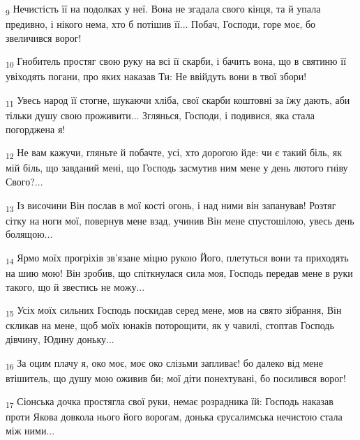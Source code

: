 \begin{tcolorbox}
\textsubscript{9} Нечистість її на подолках у неї. Вона не згадала свого кінця, та й упала предивно, і нікого нема, хто б потішив її... Побач, Господи, горе моє, бо звеличився ворог!
\end{tcolorbox}
\begin{tcolorbox}
\textsubscript{10} Гнобитель простяг свою руку на всі її скарби, і бачить вона, що в святиню її увіходять погани, про яких наказав Ти: Не ввійдуть вони в твої збори!
\end{tcolorbox}
\begin{tcolorbox}
\textsubscript{11} Увесь народ її стогне, шукаючи хліба, свої скарби коштовні за їжу дають, аби тільки душу свою проживити... Зглянься, Господи, і подивися, яка стала погорджена я!
\end{tcolorbox}
\begin{tcolorbox}
\textsubscript{12} Не вам кажучи, гляньте й побачте, усі, хто дорогою йде: чи є такий біль, як мій біль, що завданий мені, що Господь засмутив ним мене у день лютого гніву Свого?...
\end{tcolorbox}
\begin{tcolorbox}
\textsubscript{13} Із височини Він послав в мої кості огонь, і над ними він запанував! Розтяг сітку на ноги мої, повернув мене взад, учинив Він мене спустошілою, увесь день болящою...
\end{tcolorbox}
\begin{tcolorbox}
\textsubscript{14} Ярмо моїх прогріхів зв'язане міцно рукою Його, плетуться вони та приходять на шию мою! Він зробив, що спіткнулася сила моя, Господь передав мене в руки такого, що й звестись не можу...
\end{tcolorbox}
\begin{tcolorbox}
\textsubscript{15} Усіх моїх сильних Господь поскидав серед мене, мов на свято зібрання, Він скликав на мене, щоб моїх юнаків поторощити, як у чавилі, стоптав Господь дівчину, Юдину доньку...
\end{tcolorbox}
\begin{tcolorbox}
\textsubscript{16} За оцим плачу я, око моє, моє око слізьми запливає! бо далеко від мене втішитель, що душу мою оживив би; мої діти понехтувані, бо посилився ворог!
\end{tcolorbox}
\begin{tcolorbox}
\textsubscript{17} Сіонська дочка простягла свої руки, немає розрадника їй: Господь наказав проти Якова довкола нього його ворогам, донька єрусалимська нечистою стала між ними...
\end{tcolorbox}
